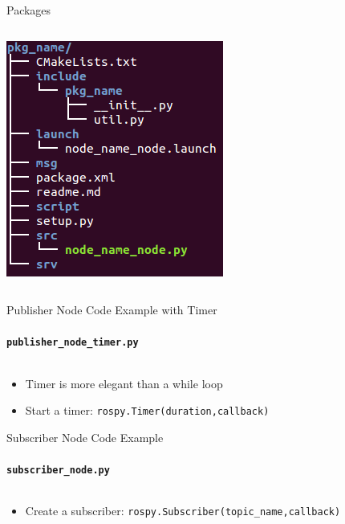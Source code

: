 \documentclass[aspectratio=43]{beamer}
\newcommand{\pyinline}[1]{\texttt{#1}}
\begin{document}
\begin{frame}{Packages}
\begin{columns}
\begin{column}{0.4\textwidth}
			\includegraphics[width=\textwidth]{fig/pkg_tree.png}
		\end{column}
	\end{columns}
\end{frame}


\begin{frame}{Publisher Node Code Example with Timer}
	\framesubtitle{\texttt{publisher\_node\_timer.py}}
	\inputminted{python}{snippet/publisher_node_timer.py}
	\begin{itemize}
	\item Timer is more elegant than a while loop
	\item Start a timer: \pyinline{rospy.Timer(duration,callback)}
	\end{itemize}
\end{frame}

\begin{frame}{Subscriber Node Code Example}
	\framesubtitle{\texttt{subscriber\_node.py}}
	\inputminted{python}{snippet/subscriber_node.py}
	\begin{itemize}
		\item Create a subscriber: \pyinline{rospy.Subscriber(topic_name,callback)}
	\end{itemize}
\end{frame}
\end{document}

